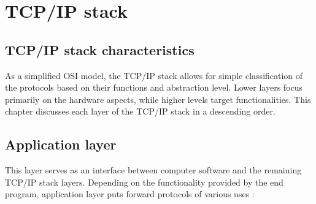\chapter{TCP/IP stack}

\section{TCP/IP stack characteristics}

As a simplified OSI model, the TCP/IP stack allows for simple classification of the protocols based on their functions and abstraction level. Lower layers focus primarily on the hardware aspects, while higher levels target functionalities. This chapter discusses each layer of the TCP/IP stack in a descending order.

\section{Application layer}

This layer serves as an interface between computer software and the remaining TCP/IP stack layers. Depending on the functionality provided by the end program, application layer puts forward protocols of various uses \cite{tcpip:layers}:

